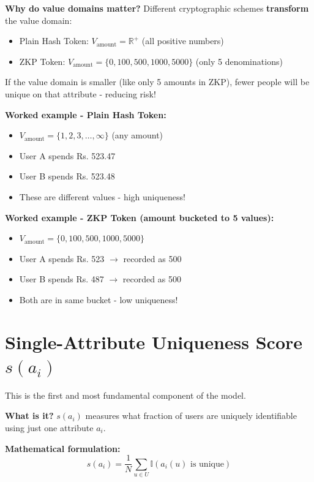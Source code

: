 \documentclass[12pt,a4paper,oneside,openany]{report}
\begin{document}
\textbf{Why do value domains matter?} Different cryptographic schemes \textbf{transform} the value domain:
\begin{itemize}
    \item Plain Hash Token: $V_{\text{amount}} = \mathbb{R}^+$ (all positive numbers)
    \item ZKP Token: $V_{\text{amount}} = \{0, 100, 500, 1000, 5000\}$ (only 5 denominations)
\end{itemize}

If the value domain is smaller (like only 5 amounts in ZKP), fewer people will be unique on that attribute - reducing risk!

\textbf{Worked example - Plain Hash Token:}
\begin{itemize}
    \item $V_{\text{amount}} = \{1, 2, 3, \ldots, \infty\}$ (any amount)
    \item User A spends Rs. 523.47
    \item User B spends Rs. 523.48
    \item These are different values - high uniqueness!
\end{itemize}

\textbf{Worked example - ZKP Token (amount bucketed to 5 values):}
\begin{itemize}
    \item $V_{\text{amount}} = \{0, 100, 500, 1000, 5000\}$
    \item User A spends Rs. 523 $\rightarrow$ recorded as 500
    \item User B spends Rs. 487 $\rightarrow$ recorded as 500
    \item Both are in same bucket - low uniqueness!
\end{itemize}

\section{Single-Attribute Uniqueness Score $s(a_i)$}
\label{sec:single}

This is the first and most fundamental component of the model.

\textbf{What is it?} $s(a_i)$ measures what fraction of users are uniquely identifiable using just one attribute $a_i$.

\textbf{Mathematical formulation:}
\begin{equation}
s(a_i) = \frac{1}{N} \sum_{u \in U} \mathbb{I}\left( a_i(u) \text{ is unique} \right)
\end{equation}
\end{document}
